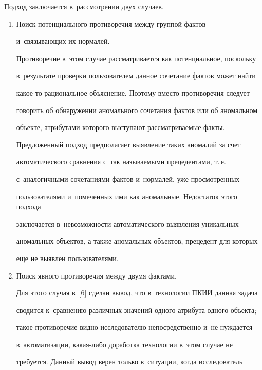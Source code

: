   


  Подход заключается в~рассмотрении двух случаев.


  \begin{enumerate}[1.]


  \item Поиск потенциального противоречия между группой фактов 


и~связывающих их нормалей. 


  


  Противоречие в~этом случае рассматривается как потенциальное, поскольку 


в~результате проверки пользователем данное сочетание фактов может найти 


ка\-кое-то рациональное объяснение. Поэтому вместо противоречия следует 


говорить об обнаружении аномального сочетания фактов или об аномальном 


объекте, атрибутами которого выступают рассматриваемые факты. 


Предложенный подход предполагает выявление таких аномалий за счет 


автоматического сравнения с~так называемыми прецедентами, т.\,е.\ 


с~аналогичными сочетаниями фактов и~нормалей, уже просмотренных 


пользователями и~помеченных ими как аномальные. Недостаток этого подхода 


заключается в~невозможности автоматического выявления уникальных 


аномальных объектов, а также аномальных объектов, прецедент для которых 


еще не выявлен пользователями.


  \item  Поиск явного противоречия между двумя фактами.


  


  Для этого случая в~[6] сделан вывод, что в~технологии ПКИИ данная задача 


сводится к~сравнению различных значений одного атрибута одного объекта; 


такое противоречие видно исследователю непосредственно и~не нуж\-да\-ет\-ся 


в~автоматизации, ка\-кая-ли\-бо доработка технологии в~этом случае не 


требуется. Данный вывод верен только в~ситуации, когда исследователь 



\end{enumerate}

